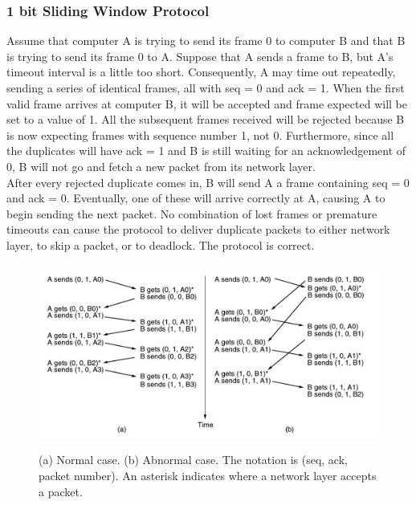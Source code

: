 \documentclass[a4paper,oneside]{book}
\begin{document}
\subsubsection{1 bit Sliding Window Protocol}
Assume that computer A is trying to send its frame 0 to computer B and that B is trying to send its frame 0 to A. Suppose that A sends a frame to B, but A's timeout interval is a little too short. Consequently, A may time out repeatedly, sending a series of identical frames, all with seq = 0 and ack = 1. When the first valid frame arrives at computer B, it will be accepted and frame expected will be set to a value of 1. All the subsequent frames received will be rejected because B is now expecting frames with sequence number 1, not
0. Furthermore, since all the duplicates will have ack = 1 and B is still waiting for an acknowledgement of 0, B will not go and fetch a new packet from its network layer.\\
After every rejected duplicate comes in, B will send A a frame containing seq = 0 and ack = 0. Eventually, one of these will arrive correctly at A, causing A to begin sending the next packet. No combination of lost frames or premature timeouts can cause the protocol to deliver duplicate packets to either network layer, to skip a packet, or to deadlock. The protocol is correct.
\begin{figure}[H]
\caption{ (a) Normal case. (b) Abnormal case. The notation is (seq, ack, packet number). An asterisk indicates where a network layer accepts a packet.}
\includegraphics[scale=0.6]{Images/slidingwindow2}
\label{fig:cn_1bit_slide}
\end{figure}
\end{document}
